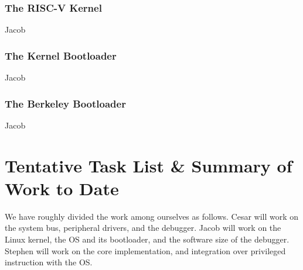 \documentclass{article}
\begin{document}
    
    \subsubsection{The RISC-V Kernel}
    Jacob
    
    \subsubsection{The Kernel Bootloader}
    Jacob
    
    \subsubsection{The Berkeley Bootloader}
    Jacob


\section{Tentative Task List \& Summary of Work to Date}
We have roughly divided the work among ourselves as follows.  Cesar will work on the system bus, peripheral drivers, and the debugger.  Jacob will work on the Linux kernel, the OS and its bootloader, and the software size of the debugger.  Stephen will work on the core implementation, and integration over privileged instruction with the OS.
\end{document}
